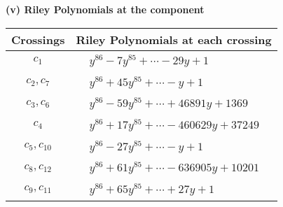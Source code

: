 \documentclass[1p]{elsarticle_modified}
\theoremstyle{definition}
\begin{document}
\newpage\renewcommand{\arraystretch}{1}
\flushleft \textbf{(v) Riley Polynomials at the component}\newline \\
\begin{tabular}{m{50pt}|m{274pt}}
Crossings & \hspace{64pt}Riley Polynomials at each crossing \\
\hline $$\begin{aligned}c_{1}\end{aligned}$$&$\begin{aligned}
&y^{86}-7 y^{85}+\cdots-29 y+1
\end{aligned}$\\
\hline $$\begin{aligned}c_{2},c_{7}\end{aligned}$$&$\begin{aligned}
&y^{86}+45 y^{85}+\cdots- y+1
\end{aligned}$\\
\hline $$\begin{aligned}c_{3},c_{6}\end{aligned}$$&$\begin{aligned}
&y^{86}-59 y^{85}+\cdots+46891 y+1369
\end{aligned}$\\
\hline $$\begin{aligned}c_{4}\end{aligned}$$&$\begin{aligned}
&y^{86}+17 y^{85}+\cdots-460629 y+37249
\end{aligned}$\\
\hline $$\begin{aligned}c_{5},c_{10}\end{aligned}$$&$\begin{aligned}
&y^{86}-27 y^{85}+\cdots- y+1
\end{aligned}$\\
\hline $$\begin{aligned}c_{8},c_{12}\end{aligned}$$&$\begin{aligned}
&y^{86}+61 y^{85}+\cdots-636905 y+10201
\end{aligned}$\\
\hline $$\begin{aligned}c_{9},c_{11}\end{aligned}$$&$\begin{aligned}
&y^{86}+65 y^{85}+\cdots+27 y+1
\end{aligned}$\\
\hline
\end{tabular}\\~\\
\end{document}
